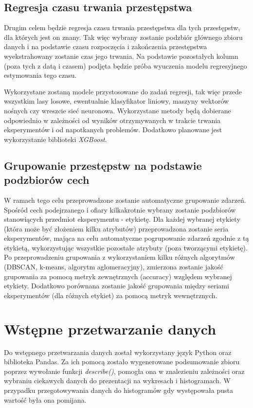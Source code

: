 \documentclass{classrep}
\begin{document}
{        \subsection{Regresja czasu trwania przestępstwa} \label{project_goal_2} {
            Drugim celem będzie regresja czasu trwania przestępstwa dla tych
            przestępstw, dla których jest on znany. Tak więc wybrany zostanie podzbiór
            głównego zbioru danych i na podstawie czasu rozpoczęcia i zakończenia
            przestępstwa wyekstrahowany zostanie czas jego trwania. Na podstawie
            pozostałych kolumn (poza tych z datą i czasem) podjęta będzie próba
            wyuczenia modelu regresyjnego estymowania tego czasu.

            Wykorzystane zostaną modele przystosowane do zadań regresji, tak więc
            przede wszystkim lasy losowe, ewentualnie klasyfikator liniowy, maszyny
            wektorów nośnych czy wreszcie sieć neuronowa. Wykorzystane metody będą
            dobierane odpowiednio w zależności od wyników otrzymywanych w trakcie
            trwania eksperymentów i od napotkanych problemów. Dodatkowo planowane jest
            wykorzystanie biblioteki \emph{XGBoost}.
        }
        
        \subsection{Grupowanie przestępstw na podstawie podzbiorów cech} \label{project_goal_3} {
            W ramach tego celu przeprowadzone zostanie automatyczne grupowanie zdarzeń.
            Spośród cech podejrzanego i ofiary kilkakrotnie wybrany zostanie podzbiorów
            stanowiących przedmiot eksperymentu - etykietę. Dla każdej wybranej
            etykiety (która może być złożeniem kilku atrybutów) przeprowadzona zostanie
            seria eksperymentów, mająca na celu automatyczne pogrupowanie zdarzeń
            zgodnie z tą etykietą, wykorzystując wszystkie pozostałe atrybuty (poza
            tworzącymi etykietę). Po przeprowadzeniu grupowania z wykorzystaniem kilku
            różnych algorytmów (DBSCAN, k-means, algorytm aglomeracyjny), zmierzona
            zostanie jakość grupowania za pomocą metryk zewnętrznych (accuracy)
            względem wybranej etykiety. Dodatkowo porównana zostanie jakość grupowania
            między seriami eksperymentów (dla różnych etykiet) za pomocą metryk
            wewnętrznych.
        }

    }

    \section{Wstępne przetwarzanie danych} {
        Do wstępnego przetwarzania danych został wykorzystany język Python oraz
        biblioteka Pandas. Za ich pomocą zostało wygenerowane podsumowanie zbioru
        poprzez wywołanie funkcji \emph{describe()}, pomogła ona w znalezieniu
        zależności oraz wybraniu ciekawych danych do prezentacji na wykresach i
        histogramach. W przypadku przegotowywania danych do histogramów gdy występowała
        pusta wartość była ona pomijana.
    }

    \begin{thebibliography}{0}
    \end{thebibliography}
\end{document}

